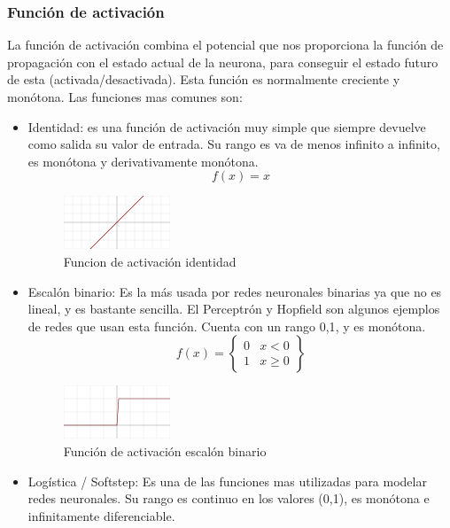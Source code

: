 \subsubsection {Función de activación}
La función de activación combina el potencial que nos proporciona la función de propagación con el estado actual de la neurona, para conseguir el estado futuro de esta (activada/desactivada). Esta función es normalmente creciente y monótona. Las funciones mas comunes son:
\begin{itemize}
\item Identidad: es una función de activación muy simple que siempre devuelve como salida su valor de entrada. Su rango es va de menos infinito a infinito, es monótona y derivativamente monótona.
\begin{equation}
f(x) = x
\end{equation}
\begin{figure}[htp]
\centering
\includegraphics[scale=1]{images/Activation_identity.png}
\caption{Funcion de activación identidad}
\end{figure}
\item Escalón binario: Es la más usada por redes neuronales binarias ya que no es lineal, y es bastante sencilla. El Perceptrón y Hopfield son algunos ejemplos de redes que usan esta función. Cuenta con un rango {0,1}, y es monótona.
\begin{equation}
f(x) = \begin{Bmatrix}
0 & x<0\\
1 & x\geq 0
\end{Bmatrix}
\end{equation}
\begin{figure}[htp]
\centering
\includegraphics[scale=1]{images/Activation_binary_step.png}
\caption{Función de activación escalón binario}
\end{figure}
\item Logística / Softstep: Es una de las funciones mas utilizadas para modelar redes neuronales. Su rango es continuo en los valores (0,1), es monótona e infinitamente diferenciable.
\begin{equation}

\end{equation}
\end{itemize}
